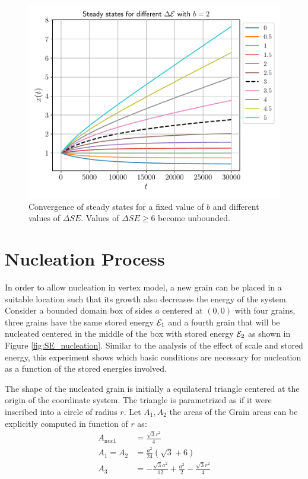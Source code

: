 \begin{figure}
    \centering
    \includegraphics[scale=0.6]{figures/SE_experiments.pdf}
    \caption[Convergence of steady states for a fixed value of $b$ and different values of $\Delta SE$]{Convergence of steady states for a fixed value of $b$ and different values of $\Delta SE$. Values of $\Delta SE \geq 6$ become unbounded.}
    \label{fig:SE_experiments}
\end{figure}

\section{Nucleation Process}
In order to allow nucleation in vertex model, a new grain can be placed in a suitable location such that its growth also decreases the energy of the system. Consider a bounded domain box of sides $a$ centered at $(0,0)$ with four grains, three grains have the same stored energy $\mathcal{E}_1$ and a fourth grain that will be nucleated centered in the middle of the box with stored energy $\mathcal{E}_2$ as shown in Figure \ref{fig:SE_nucleation}. Similar to the analysis of the effect of scale and stored energy, this experiment shows which basic conditions are necessary for nucleation as a function of the stored energies involved.

The shape of the nucleated grain is initially a equilateral triangle centered at the origin of the coordinate system. The triangle is parametrized as if it were inscribed into a circle of radius $r$. Let $A_1, A_2$ the areas of the Grain areas can be explicitly computed in function of $r$ as:
\begin{align*}
A_{\text{nucl.}} &= \frac{\sqrt{3}r^2}{4} \\
A_1 = A_2 &= \frac{a^{2}}{24} \left(\sqrt{3} + 6\right)\\ A_3 &= - \frac{\sqrt{3} a^{2}}{12} + \frac{a^{2}}{2} - \frac{\sqrt{3} r^{2}}{4}
\end{align*}


